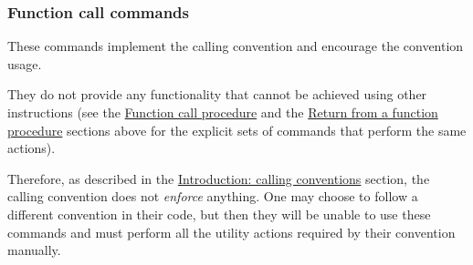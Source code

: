 \hypertarget{functions:commands}{
    \subsubsection{Function call commands}
}


\vspace{0.5cm}

These commands implement the
\hypertarget{functions:convention}{ calling convention} and encourage
the convention usage.

They do not provide any functionality that cannot be achieved using other
instructions (see the \hyperlink{functions:call}{Function call procedure} and
the \hyperlink{functions:return}{Return from a function procedure} sections
above for the explicit sets of commands that perform the same actions).

Therefore, as described in the
\hyperlink{functions:introduction}{Introduction: calling conventions}
section, the  calling convention does not \textit{enforce}
anything.
One may choose to follow a different convention in their code, but then
they will be unable to use these commands and must perform all the utility
actions required by their convention manually.

\vspace{-0.3cm}
\paragraph{}\


